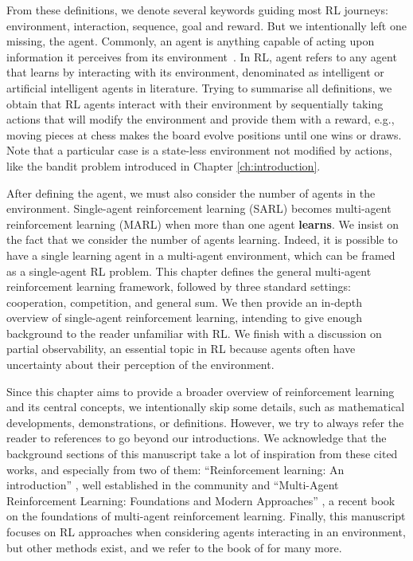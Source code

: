 From these definitions, we denote several keywords guiding most RL journeys: environment, interaction, sequence, goal and reward.
But we intentionally left one missing, the agent.
Commonly, an agent is anything capable of acting upon information it perceives from its environment~\citep{russel2010}.
In RL, agent refers to any agent that learns by interacting with its environment, denominated as intelligent or artificial intelligent agents in literature.
Trying to summarise all definitions, we obtain that RL agents interact with their environment by sequentially taking actions that will modify the environment and provide them with a reward, e.g., moving pieces at chess makes the board evolve positions until one wins or draws.
Note that a particular case is a state-less environment not modified by actions, like the bandit problem introduced in Chapter \ref{ch:introduction}.

After defining the agent, we must also consider the number of agents in the environment.
Single-agent reinforcement learning (SARL) becomes multi-agent reinforcement learning (MARL) when more than one agent \textbf{learns}.
We insist on the fact that we consider the number of agents learning.
Indeed, it is possible to have a single learning agent in a multi-agent environment, which can be framed as a single-agent RL problem.
This chapter defines the general multi-agent reinforcement learning framework, followed by three standard settings: cooperation, competition, and general sum.
We then provide an in-depth overview of single-agent reinforcement learning, intending to give enough background to the reader unfamiliar with RL.
We finish with a discussion on partial observability, an essential topic in RL because agents often have uncertainty about their perception of the environment.

Since this chapter aims to provide a broader overview of reinforcement learning and its central concepts, we intentionally skip some details, such as mathematical developments, demonstrations, or definitions.
However, we try to always refer the reader to references to go beyond our introductions.
We acknowledge that the background sections of this manuscript take a lot of inspiration from these cited works, and especially from two of them: ``Reinforcement learning: An introduction'' \citep{sutton2018reinforcement}, well established in the community and ``Multi-Agent Reinforcement Learning: Foundations and Modern Approaches'' \citep{marl-book}, a recent book on the foundations of multi-agent reinforcement learning.
Finally, this manuscript focuses on RL approaches when considering agents interacting in an environment, but other methods exist, and we refer to the book of \cite{russel2010} for many more.


